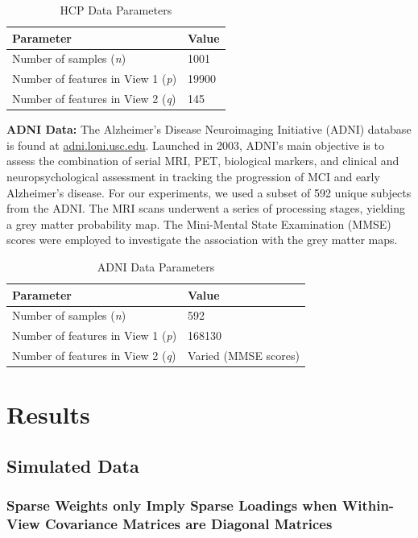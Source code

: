 \begin{table}[h]
\centering
\caption{HCP Data Parameters}
\begin{tabular}{| l | l |}
\hline
\textbf{Parameter} & \textbf{Value} \\
\hline
Number of samples (\textit{n}) & 1001 \\
Number of features in View 1 (\textit{p}) & 19900 \\
Number of features in View 2 (\textit{q}) & 145 \\
\hline
\end{tabular}
\label{table:hcp-parameters}
\end{table}

\textbf{ADNI Data:}
The Alzheimer’s Disease Neuroimaging Initiative (ADNI) database is found at \url{adni.loni.usc.edu}.
Launched in 2003, ADNI's main objective is to assess the combination of serial MRI, PET, biological markers, and clinical and neuropsychological assessment in tracking the progression of MCI and early Alzheimer’s disease.
For our experiments, we used a subset of 592 unique subjects from the ADNI. The MRI scans underwent a series of processing stages, yielding a grey matter probability map.
The Mini-Mental State Examination (MMSE) scores were employed to investigate the association with the grey matter maps.

\begin{table}[h]
\centering
\caption{ADNI Data Parameters}
\begin{tabular}{| l | l |}
\hline
\textbf{Parameter} & \textbf{Value} \\
\hline
Number of samples (\textit{n}) & 592 \\
Number of features in View 1 (\textit{p}) & 168130 \\
Number of features in View 2 (\textit{q}) & Varied (MMSE scores) \\
\hline
\end{tabular}
\label{table:adni-parameters}
\end{table}

\section{Results}

\subsection{Simulated Data}

\subsubsection{Sparse Weights only Imply Sparse Loadings when Within-View Covariance Matrices are Diagonal Matrices}

